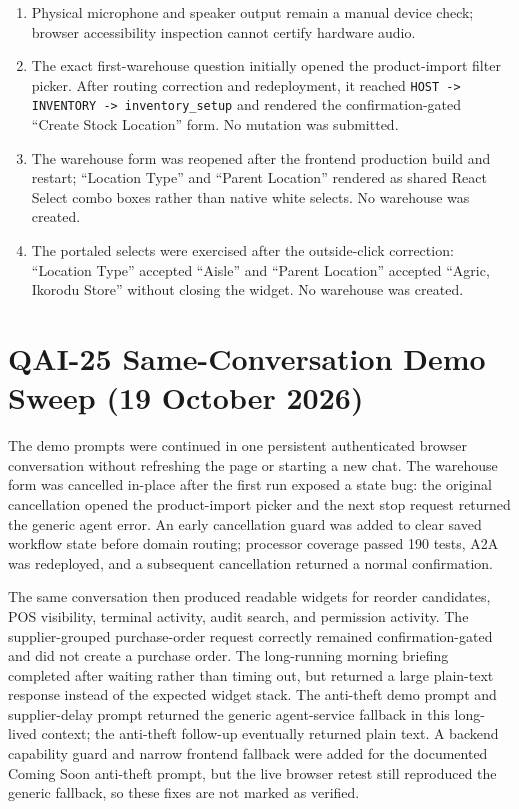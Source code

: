 \documentclass[10pt]{article}
\begin{document}
\begin{enumerate}[leftmargin=18pt,itemsep=5pt]
\item Physical microphone and speaker output remain a manual device check; browser accessibility inspection cannot certify hardware audio.
\item The exact first-warehouse question initially opened the product-import filter picker. After routing correction and redeployment, it reached \texttt{HOST -> INVENTORY -> inventory\_setup} and rendered the confirmation-gated ``Create Stock Location'' form. No mutation was submitted.
\item The warehouse form was reopened after the frontend production build and restart; ``Location Type'' and ``Parent Location'' rendered as shared React Select combo boxes rather than native white selects. No warehouse was created.
\item The portaled selects were exercised after the outside-click correction: ``Location Type'' accepted ``Aisle'' and ``Parent Location'' accepted ``Agric, Ikorodu Store'' without closing the widget. No warehouse was created.
\end{enumerate}

\section{QAI-25 Same-Conversation Demo Sweep (19 October 2026)}
The demo prompts were continued in one persistent authenticated browser conversation without refreshing the page or starting a new chat. The warehouse form was cancelled in-place after the first run exposed a state bug: the original cancellation opened the product-import picker and the next stop request returned the generic agent error. An early cancellation guard was added to clear saved workflow state before domain routing; processor coverage passed 190 tests, A2A was redeployed, and a subsequent cancellation returned a normal confirmation.

The same conversation then produced readable widgets for reorder candidates, POS visibility, terminal activity, audit search, and permission activity. The supplier-grouped purchase-order request correctly remained confirmation-gated and did not create a purchase order. The long-running morning briefing completed after waiting rather than timing out, but returned a large plain-text response instead of the expected widget stack. The anti-theft demo prompt and supplier-delay prompt returned the generic agent-service fallback in this long-lived context; the anti-theft follow-up eventually returned plain text. A backend capability guard and narrow frontend fallback were added for the documented Coming Soon anti-theft prompt, but the live browser retest still reproduced the generic fallback, so these fixes are not marked as verified.
\end{document}
